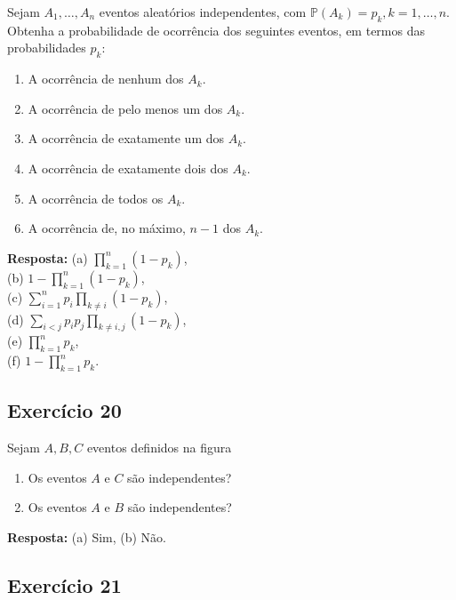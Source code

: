 \documentclass[
  letterpaper,
  DIV=11,
  numbers=noendperiod]{scrartcl}
\providecommand{\tightlist}{%
  \setlength{\itemsep}{0pt}\setlength{\parskip}{0pt}}\usepackage{longtable,booktabs,array}
\begin{document}
Sejam \(A_1, \ldots, A_n\) eventos aleatórios independentes, com
\(\mathbb{P}(A_k) = p_k, k = 1, \ldots, n\). Obtenha a probabilidade de
ocorrência dos seguintes eventos, em termos das probabilidades \(p_k\):

\begin{enumerate}
\def\labelenumi{(\alph{enumi})}
\item
  A ocorrência de nenhum dos \(A_k\).
\item
  A ocorrência de pelo menos um dos \(A_k\).
\item
  A ocorrência de exatamente um dos \(A_k\).
\item
  A ocorrência de exatamente dois dos \(A_k\).
\item
  A ocorrência de todos os \(A_k\).
\item
  A ocorrência de, no máximo, \(n - 1\) dos \(A_k\).
\end{enumerate}

\textbf{Resposta:} (a) \(\prod_{k=1}^{n} (1 - p_k)\),\\
(b) \(1 - \prod_{k=1}^{n} (1 - p_k)\),\\
(c) \(\sum_{i=1}^{n} p_i \prod_{k \neq i} (1 - p_k)\),\\
(d) \(\sum_{i<j} p_i p_j \prod_{k \neq i,j} (1 - p_k)\),\\
(e) \(\prod_{k=1}^{n} p_k\),\\
(f) \(1 - \prod_{k=1}^{n} p_k\).

\hypertarget{exercuxedcio-20}{%
\subsection{Exercício 20}\label{exercuxedcio-20}}

Sejam \(A, B, C\) eventos definidos na figura

\begin{enumerate}
\def\labelenumi{(\alph{enumi})}
\tightlist
\item
  Os eventos \(A\) e \(C\) são independentes?\\
\item
  Os eventos \(A\) e \(B\) são independentes?
\end{enumerate}

\textbf{Resposta:} (a) Sim, (b) Não.

\hypertarget{exercuxedcio-21}{%
\subsection{Exercício 21}\label{exercuxedcio-21}}
\end{document}
